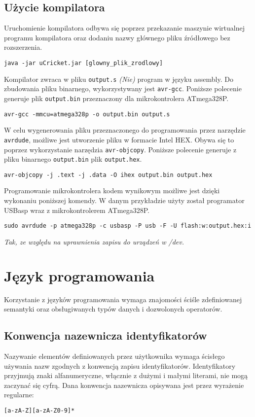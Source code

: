 \subsection{Użycie kompilatora}
Uruchomienie kompilatora odbywa się poprzez przekazanie maszynie wirtualnej programu kompilatora oraz dodaniu nazwy głównego pliku źródłowego bez rozszerzenia.
\begin{lstlisting}
java -jar uCricket.jar [glowny_plik_zrodlowy]
\end{lstlisting}
Kompilator zwraca w pliku \lstinline|output.s|  \textit{(Nie)} program w języku assembly. Do zbudowania pliku binarnego, wykorzystywany jest \lstinline|avr-gcc|. Poniższe polecenie generuje plik \lstinline|output.bin| przeznaczony dla mikrokontrolera ATmega328P.
\begin{lstlisting}
avr-gcc -mmcu=atmega328p -o output.bin output.s
\end{lstlisting}
W celu wygenerowania pliku przeznaczonego do programowania przez narzędzie \lstinline|avrdude|, możliwe jest utworzenie pliku w formacie Intel HEX. Obywa się to poprzez wykorzystanie narzędzia \lstinline|avr-objcopy|. Poniższe polecenie generuje z pliku binarnego \lstinline|output.bin| plik \lstinline|output.hex|.
\begin{lstlisting}
avr-objcopy -j .text -j .data -O ihex output.bin output.hex
\end{lstlisting}
Programowanie mikrokontrolera kodem wynikowym możliwe jest dzięki wykonaniu poniższej komendy. W danym przykładzie użyty został programator USBasp wraz z mikrokontrolerem ATmega328P.
\begin{lstlisting}
sudo avrdude -p atmega328p -c usbasp -P usb -F -U flash:w:output.hex:i
\end{lstlisting}
\textit{Tak, ze względu na uprawnienia zapisu do urządzeń w /dev.}

\section{Język programowania}
Korzystanie z języków programowania wymaga znajomości ściśle zdefiniowanej semantyki oraz obsługiwanych typów danych i dozwolonych operatorów. 
\subsection{Konwencja nazewnicza identyfikatorów}
Nazywanie elementów definiowanych przez użytkownika wymaga ścisłego używania nazw zgodnych z konwencją zapisu identyfikatorów. Identyfikatory przyjmują znaki alfanumeryczne, włącznie z dużymi i małymi literami, nie mogą zaczynać się cyfrą. Dana konwencja nazewnicza opisywana jest przez wyrażenie regularne:
\begin{lstlisting}
[a-zA-Z][a-zA-Z0-9]*
\end{lstlisting}

